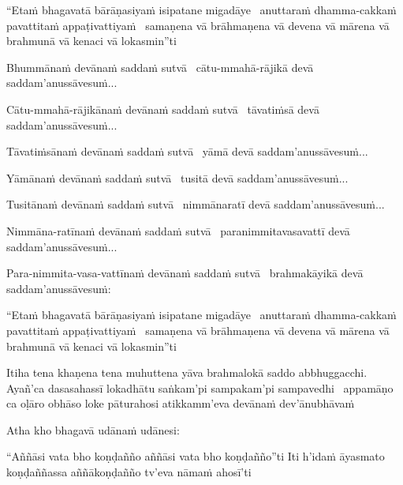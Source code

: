 \begin{pali-hang}
  ``Etaṁ bhagavatā bārāṇasiyaṁ isipatane migadāye \breathmark\ anuttaraṁ dhamma-cakkaṁ pavattitaṁ appaṭivattiyaṁ \breathmark\ samaṇena vā brāhmaṇena vā devena vā mārena vā brahmunā vā kenaci vā lokasmin''ti
\end{pali-hang}

\begin{pali-hang}
  Bhummānaṁ devānaṁ saddaṁ sutvā \breathmark\  cātu-mmahā-rājikā devā saddam'anussāvesuṁ...
\end{pali-hang}

\begin{pali-hang}
  Cātu-mmahā-rājikānaṁ devānaṁ saddaṁ sutvā \breathmark\  tāvatiṁsā devā saddam'anussāvesuṁ...
\end{pali-hang}

\begin{pali-hang}
  Tāvatiṁsānaṁ devānaṁ saddaṁ sutvā \breathmark\  yāmā devā saddam'anussāvesuṁ...
\end{pali-hang}

\begin{pali-hang}
  Yāmānaṁ devānaṁ saddaṁ sutvā \breathmark\  tusitā devā saddam'anussāvesuṁ...
\end{pali-hang}

\begin{pali-hang}
  Tusitānaṁ devānaṁ saddaṁ sutvā \breathmark\  nimmānaratī devā saddam'anussāvesuṁ...
\end{pali-hang}

\begin{pali-hang}
  Nimmāna-ratīnaṁ devānaṁ saddaṁ sutvā \breathmark\  paranimmitavasavattī devā saddam'anussāvesuṁ...
\end{pali-hang}

\begin{pali-hang}
  Para-nimmita-vasa-vattīnaṁ devānaṁ saddaṁ sutvā \breathmark\  brahmakāyikā devā saddam'anussāvesuṁ:
\end{pali-hang}

\begin{pali-hang}
  ``Etaṁ bhagavatā bārāṇasiyaṁ isipatane migadāye \breathmark\ anuttaraṁ dhamma-cakkaṁ pavattitaṁ appaṭivattiyaṁ \breathmark\ samaṇena vā brāhmaṇena vā devena vā mārena vā brahmunā vā kenaci vā lokasmin''ti
\end{pali-hang}

\begin{pali-hang}
  Itiha tena khaṇena tena muhuttena  yāva brahmalokā saddo abbhuggacchi. Ayañ'ca dasasahassī lokadhātu saṅkam'pi sampakam'pi sampavedhi \breathmark\ appamāṇo ca oḷāro obhāso loke pāturahosi atikkamm'eva devānaṁ dev'ānubhāvaṁ
\end{pali-hang}

Atha kho bhagavā udānaṁ udānesi:

\begin{pali-hang}
  ``Aññāsi vata bho koṇḍañño aññāsi vata bho koṇḍañño''ti Iti h'idaṁ āyasmato koṇḍaññassa aññākoṇḍañño tv'eva nāmaṁ ahosī'ti
\end{pali-hang}

\ifninebythirteenversion\vspace{-1em}\fi

\suttaRef{[SN 56.11]}

